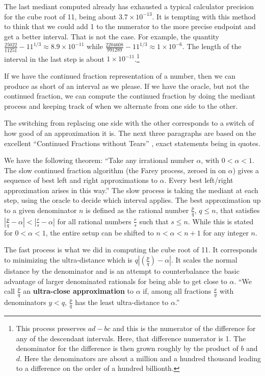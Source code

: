 \documentclass[12pt]{article}
\begin{document}
The last mediant computed already has exhausted a typical calculator precision for the cube root of 11, being about $3.7\times 10^{-13}$. It is tempting with this method to think that we could add 1 to the numerator to the more precise endpoint and get a better interval. That is not the case. For example, the quantity $\frac{25022}{11251} - 11^{1/3} \approx 8.9\times 10^{-11}$ while $\frac{2204608}{991289} - 11^{1/3} \approx 1\times10^{-6}$. The length of the interval in the last step is about $1\times10^{-11}$.\footnote{This process preserves $ad -bc$ and this is the numerator of the difference for any of the descendant intervals. Here, that difference numerator is 1. The denominator for the difference is then grown roughly by the product of $b$ and $d$. Here the denominators are about a million and a hundred thousand leading to a difference on the order of a hundred billionth.} 

If we have the continued fraction representation of a number, then we can produce as short of an interval as we please. If we have the oracle, but not the continued fraction, we can compute the continued fraction by doing the mediant process and keeping track of when we alternate from one side to the other. 

The switching from replacing one side with the other corresponds to a switch of how good of an approximation it is. The next three paragraphs are based on the excellent ``Continued Fractions without Tears'' \cite{richards}, exact statements being in quotes.  

We have the following theorem: ``Take any irrational number $\alpha$, with $0 < \alpha < 1$. The slow continued fraction algorithm (the Farey process, zeroed in on $\alpha$) gives a sequence of best left and right approximations to $\alpha$. Every best left/right approximation arises in this way.'' The slow process is taking the mediant at each step, using the oracle to decide which interval applies. The best approximation up to a given denominator $n$ is defined as the rational number $\frac{p}{q}$, $q  \leq n$, that satisfies $|\frac{p}{q} - \alpha | < |\frac{r}{s} -\alpha|$ for all rational numbers $\frac{r}{s}$ such that $s \leq n$. While this is stated for $0 < \alpha < 1$, the entire setup can be shifted to $n < \alpha < n+1 $ for any integer $n$. 

The fast process is what we did in computing the cube root of 11. It corresponds to minimizing the ultra-distance which is $q|(\frac{p}{q})-\alpha|$. It scales the normal distance by the denominator and is an attempt to counterbalance the basic advantage of larger denominated rationals for being able to get close to $\alpha$.  ``We call $\frac{p}{q}$ an \textbf{ultra-close approximation} to $\alpha$ if, among all fractions $\frac{x}{y}$ with denominators $y < q$, $\frac{p}{q}$ has the least ultra-distance to $\alpha$.''
\end{document}
